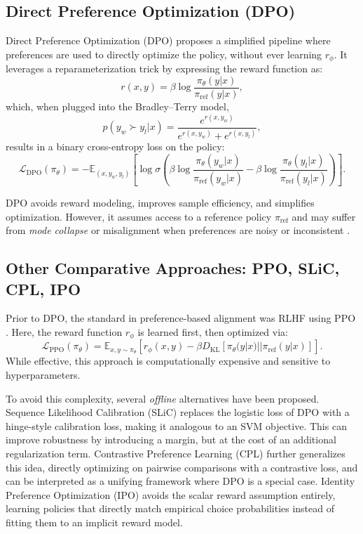 \documentclass[a4paper,oneside,10pt,ngerman,english]{scrartcl}
\begin{document}
\subsection{Direct Preference Optimization (DPO)}

Direct Preference Optimization (DPO) \cite{rafailov2023direct} proposes a simplified pipeline where preferences are used to directly optimize the policy, without ever learning $r_\phi$. It leverages a reparameterization trick by expressing the reward function as:
\[
r(x, y) = \beta \log \frac{\pi_\theta(y | x)}{\pi_{\text{ref}}(y | x)},
\]
which, when plugged into the Bradley--Terry model,
\[
p(y_w \succ y_l | x) = \frac{e^{r(x, y_w)}}{e^{r(x, y_w)} + e^{r(x, y_l)}},
\]
results in a binary cross-entropy loss on the policy:
\[
\mathcal{L}_{\text{DPO}}(\pi_\theta) = -\mathbb{E}_{(x, y_w, y_l)} \left[ \log \sigma\left( \beta \log \frac{\pi_\theta(y_w|x)}{\pi_{\text{ref}}(y_w|x)} - \beta \log \frac{\pi_\theta(y_l|x)}{\pi_{\text{ref}}(y_l|x)} \right) \right].
\]

DPO avoids reward modeling, improves sample efficiency, and simplifies optimization. However, it assumes access to a reference policy $\pi_{\text{ref}}$ and may suffer from \textit{mode collapse} or misalignment when preferences are noisy or inconsistent \cite{rafailov2023direct, kirk2024understanding}.

\subsection{Other Comparative Approaches: PPO, SLiC, CPL, IPO}

Prior to DPO, the standard in preference-based alignment was RLHF using PPO \cite{schulman2017ppo}. Here, the reward function $r_\phi$ is learned first, then optimized via:
\[
\mathcal{L}_{\text{PPO}}(\pi_\theta) = \mathbb{E}_{x,y \sim \pi_\theta} \left[ r_\phi(x,y) - \beta D_{\text{KL}}[\pi_\theta(y|x) || \pi_{\text{ref}}(y|x)] \right].
\]
While effective, this approach is computationally expensive and sensitive to hyperparameters.

To avoid this complexity, several \emph{offline} alternatives have been proposed.  
Sequence Likelihood Calibration (SLiC) \cite{zhao2023slic} replaces the logistic loss of DPO with a hinge-style calibration loss, making it analogous to an SVM objective. This can improve robustness by introducing a margin, but at the cost of an additional regularization term.  
Contrastive Preference Learning (CPL) \cite{hejna2024contrastive} further generalizes this idea, directly optimizing on pairwise comparisons with a contrastive loss, and can be interpreted as a unifying framework where DPO is a special case.  
Identity Preference Optimization (IPO) \cite{azar2023ipo} avoids the scalar reward assumption entirely, learning policies that directly match empirical choice probabilities instead of fitting them to an implicit reward model.  
\end{document}
